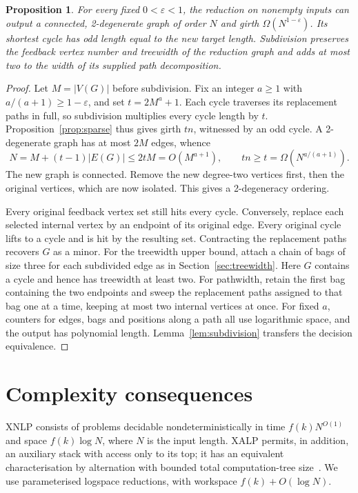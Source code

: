 \documentclass[11pt]{article}
\newtheorem{proposition}[theorem]{Proposition}
\theoremstyle{remark}
\begin{document}
\begin{proposition}\label{prop:amplify}
For every fixed $0<\varepsilon<1$, the reduction on nonempty inputs
can output a connected, 2-degenerate graph of order $N$ and girth
$\Omega(N^{1-\varepsilon})$. Its shortest cycle has odd length equal to
the new target length. Subdivision preserves the feedback vertex number
and treewidth of the reduction graph and adds at most two to the width
of its supplied path decomposition.
\end{proposition}
\begin{proof}
Let $M=|V(G)|$ before subdivision. Fix an integer $a\geq1$ with
$a/(a+1)\geq1-\varepsilon$, and set $t=2M^a+1$.
Each cycle traverses its replacement paths in full, so subdivision
multiplies every cycle length by $t$. Proposition~\ref{prop:sparse} thus
gives girth $tn$, witnessed by an odd cycle. A 2-degenerate graph has
at most $2M$ edges, whence
\[
 N=M+(t-1)|E(G)|\leq 2tM=O(M^{a+1}),\qquad
 tn\geq t=\Omega(N^{a/(a+1)}).
\]
The new graph is connected. Remove the new degree-two vertices first, then the original vertices,
which are now isolated. This gives a 2-degeneracy ordering.

Every original feedback vertex set still hits every cycle. Conversely,
replace each selected internal vertex by an endpoint of its original
edge. Every original cycle lifts to a cycle and is hit by the resulting
set. Contracting the replacement paths recovers $G$ as a minor.
For the treewidth upper bound, attach a chain of bags of size three for
each subdivided edge as in Section~\ref{sec:treewidth}. Here $G$ contains
a cycle and hence has treewidth at least two. For pathwidth, retain the
first bag containing the two endpoints and sweep the replacement paths
assigned to that bag one at a time, keeping at most two internal vertices
at once. For fixed $a$, counters for edges, bags and positions along a
path all use logarithmic space, and the output has polynomial length.
Lemma~\ref{lem:subdivision} transfers the decision equivalence.
\end{proof}

\section{Complexity consequences}\label{sec:complexity}
XNLP consists of problems decidable nondeterministically in time
$f(k)N^{O(1)}$ and space $f(k)\log N$, where $N$ is the input length.
XALP permits, in addition, an auxiliary stack with access only to its top;
it has an equivalent characterisation by alternation with bounded total
computation-tree size~\cite{bgns2024,bggpp2022}. We use parameterised
logspace reductions, with workspace $f(k)+O(\log N)$.
\end{document}
